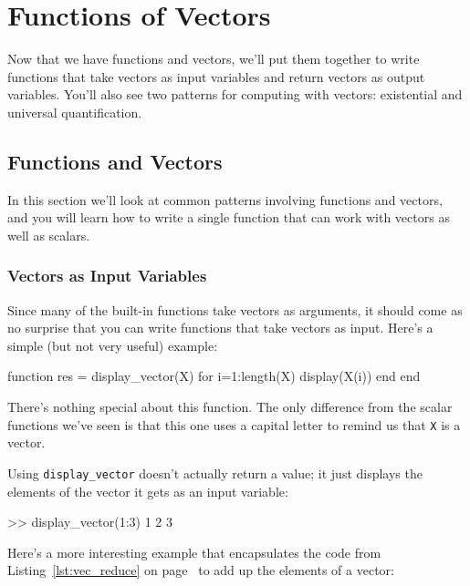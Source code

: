 \chapter{Functions of Vectors}


Now that we have functions and vectors, we'll put them together to write functions that take vectors as input variables and return vectors as output variables.  You'll also see two patterns for computing with vectors: existential and universal quantification.


\section{Functions and Vectors}

In this section we'll look at common patterns involving functions and vectors, and you will learn how to write a single function that can work with \mbox{vectors} as well as scalars.

\subsection{Vectors as Input Variables}

Since many of the built-in functions take vectors as arguments,
it should come as no surprise that you can write functions that
take vectors as input.  Here's a simple (but not very useful) example:


\begin{code}
function res = display_vector(X)
    for i=1:length(X)
        display(X(i))
    end
end
\end{code}

There's nothing special about this function.  The only
difference from the scalar functions we've seen is that this one uses
a capital letter to remind us that \lstinline{X} is a vector.

Using \lstinline{display_vector} doesn't actually return a value; it just displays the elements of the vector it gets as an input variable:

\begin{code}
>> display_vector(1:3)
    1
    2
    3
\end{code}

Here's a more interesting example that encapsulates the code
from Listing~\ref{lst:vec_reduce} on page~\pageref{lst:vec_reduce} to add up the elements of a vector:


